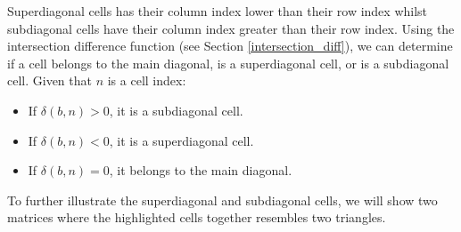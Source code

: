 \documentclass[twoside,openany,12pt]{book}
\begin{document}
    Superdiagonal cells has their column index lower than their row index whilst subdiagonal cells have their column index greater than their row index. Using the intersection difference function (see Section \ref{intersection_diff}), we can determine if a cell belongs to the main diagonal, is a superdiagonal cell, or is a subdiagonal cell. Given that $n$ is a cell index:
    \begin{itemize}
        \item If $\delta(b,n) > 0$, it is a subdiagonal cell.
        \item If $\delta(b,n) < 0$, it is a superdiagonal cell.
        \item If $\delta(b,n) = 0$, it belongs to the main diagonal.
    \end{itemize}

    To further illustrate the superdiagonal and subdiagonal cells, we will show two matrices where the highlighted cells together resembles two triangles.
\end{document}
